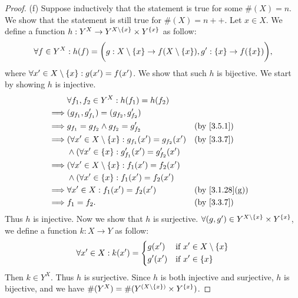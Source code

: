 \begin{proof}{(f)}
	Suppose inductively that the statement is true for some \(\#(X) = n\).
	We show that the statement is still true for \(\#(X) = n++\).
	Let \(x \in X\).
	We define a function \(h : Y^X \to Y^{X \setminus \left\lbrace x\right\rbrace} \times Y^{\left\lbrace x\right\rbrace}\) as follow:
	\[
		\forall f \in Y^X : h(f) = \bigg(g : X \setminus \left\lbrace x\right\rbrace \to f(X \setminus \left\lbrace x\right\rbrace), g' : \left\lbrace x\right\rbrace \to f(\left\lbrace x\right\rbrace)\bigg),
	\]
	where \(\forall x' \in X \setminus \left\lbrace x\right\rbrace : g(x') = f(x')\).
	We show that such \(h\) is bijective.
	We start by showing \(h\) is injective.
	\begin{align*}
		         & \forall f_1, f_2 \in Y^X : h(f_1) = h(f_2)                                                        \\
		\implies & (g_{f_1}, g_{f_1}') = (g_{f_2}, g_{f_2}')                                                         \\
		\implies & g_{f_1} = g_{f_2} \land g_{f_2} = g_{f_2}'                      &  & \by{3.5.1}                   \\
		\implies & (\forall x' \in X \setminus \set{x} : g_{f_1}(x') = g_{f_2}(x') &  & \by{3.3.7}                   \\
		         & \land (\forall x' \in \set{x} : g_{f_1}'(x') = g_{f_2}'(x')                                       \\
		\implies & (\forall x' \in X \setminus \set{x} : f_1(x') = f_2(x')                                           \\
		         & \land (\forall x' \in \set{x} : f_1(x') = f_2(x')                                                 \\
		\implies & \forall x' \in X : f_1(x') = f_2(x')                            &  & \text{(by \cref{3.1.28}(g))} \\
		\implies & f_1 = f_2.                                                      &  & \by{3.3.7}
	\end{align*}
	Thus \(h\) is injective.
	Now we show that \(h\) is surjective.
	\(\forall (g, g') \in Y^{X \setminus \left\lbrace x\right\rbrace} \times Y^{\left\lbrace x\right\rbrace}\), we define a function \(k : X \to Y\) as follow:
	\[
		\forall x' \in X : k(x') = \begin{dcases}
			g(x')  & \text{if } x' \in X \setminus \left\lbrace x\right\rbrace \\
			g'(x') & \text{if } x' \in \left\lbrace x\right\rbrace
		\end{dcases}
	\]
	Then \(k \in Y^X\).
	Thus \(h\) is surjective.
	Since \(h\) is both injective and surjective, \(h\) is bijective, and we have \(\#(Y^X) = \#(Y^{(X \setminus \left\lbrace x\right\rbrace)} \times Y^{\left\lbrace x\right\rbrace})\).

\end{proof}
